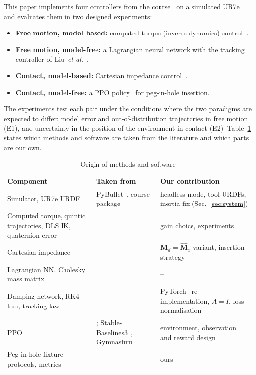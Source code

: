 \documentclass[conference]{IEEEtran}
\newcommand{\bM}{\boldsymbol{M}}
\begin{document}
This paper implements four controllers from the course~\cite{carloni2026} on a simulated UR7e and evaluates them in two designed experiments:
\begin{itemize}
\item \textbf{Free motion, model-based:} computed-torque (inverse dynamics) control~\cite{siciliano2009}.
\item \textbf{Free motion, model-free:} a Lagrangian neural network with the tracking controller of Liu~\emph{et al.}~\cite{liu2024}.
\item \textbf{Contact, model-based:} Cartesian impedance control~\cite{hogan1985,khatib1987,ott2008}.
\item \textbf{Contact, model-free:} a PPO policy~\cite{schulman2017,shahid2022} for peg-in-hole insertion.
\end{itemize}
The experiments test each pair under the conditions where the two paradigms are expected to differ: model error and out-of-distribution trajectories in free motion (E1), and uncertainty in the position of the environment in contact (E2). Table~\ref{tab:attribution} states which methods and software are taken from the literature and which parts are our own.

\begin{table}[t]
\caption{Origin of methods and software}
\label{tab:attribution}
\centering\footnotesize
\setlength{\tabcolsep}{3pt}
\begin{tabular}{p{}p{}p{}}
\toprule
Component & Taken from & Our contribution \\
\midrule
Simulator, UR7e URDF & PyBullet~\cite{pybullet}, course package~\cite{moret2026} & headless mode, tool URDFs, inertia fix (Sec.~\ref{sec:system}) \\
Computed torque, quintic trajectories, DLS IK, quaternion error & \cite{siciliano2009,carloni2026} & gain choice, experiments \\
Cartesian impedance & \cite{hogan1985,khatib1987,ott2008,carloni2026} & $\bM_d=\hat{\bM}_x$ variant, insertion strategy \\
Lagrangian NN, Cholesky mass matrix & \cite{lutter2019delan,lutter2023,cranmer2020} & -- \\
Damping network, RK4 loss, tracking law & \cite{liu2024} & PyTorch~\cite{paszke2019} re-implementation, $A=I$, loss normalisation \\
PPO & \cite{schulman2017,shahid2022}; Stable-Baselines3~\cite{raffin2021}, Gymnasium~\cite{towers2024} & environment, observation and reward design \\
Peg-in-hole fixture, protocols, metrics & -- & ours \\
\bottomrule
\end{tabular}
\end{table}
\end{document}
